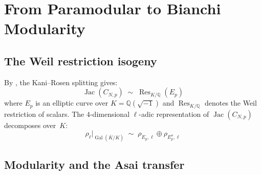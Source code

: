 \documentclass[11pt,a4paper]{article}
\theoremstyle{definition}
\DeclareMathOperator{\Gal}{Gal}
\DeclareMathOperator{\Jac}{Jac}
\DeclareMathOperator{\Res}{Res}
\begin{document}
\section{From Paramodular to Bianchi Modularity}\label{sec:bridge}

\subsection{The Weil restriction isogeny}

By \cite[Theorem~4.1]{Companion7}, the Kani--Rosen splitting gives:
$$\Jac(C_{N,p}) \;\sim\; \Res_{K/\mathbb{Q}}(E_p)$$
where $E_p$ is an elliptic curve over $K = \mathbb{Q}(\sqrt{-1})$ and $\Res_{K/\mathbb{Q}}$ denotes the Weil restriction of scalars. The $4$-dimensional $\ell$-adic representation of $\Jac(C_{N,p})$ decomposes over~$K$:
$$\rho_\ell|_{\Gal(\overline{K}/K)} \;\sim\; \rho_{E_p,\ell} \oplus \rho_{E_p^\sigma,\ell}$$

\subsection{Modularity and the Asai transfer}
\end{document}
